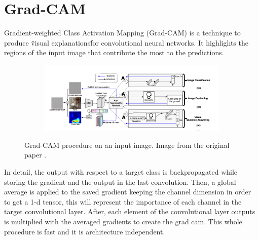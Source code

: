 \documentclass[../document.tex]{subfiles}
\begin{document}
\section{Grad-CAM}
Gradient-weighted Class Activation Mapping (Grad-CAM) \cite{gradcam} is a technique to produce \"visual explanations\" for convolutional neural networks. It highlights the regions of the input image that contribute the most to the predictions. 
\begin{figure} [htbp]
    \centering
    \begin{subfigure}[b]{1\textwidth}
        \includegraphics[width=\linewidth]{../img/5/grad_cam1.png}
    \end{subfigure}
\caption{Grad-CAM procedure on an input image. Image from the original paper \cite{gradcam}.}
\end{figure}
In detail, the output with respect to a target class is backpropagated while storing the gradient and the output in the last convolution. Then, a global average is applied to the saved gradient keeping the channel dimension in order to get a 1-d tensor, this will represent the importance of each channel in the target convolutional layer. After, each element of the convolutional layer outputs is multiplied with the averaged gradients to create the grad cam. This whole procedure is fast and it is architecture independent.


% 
%
\end{document}
